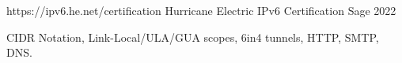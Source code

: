 \begin{cventries}
  \cventry
    {https://ipv6.he.net/certification}
    {Hurricane Electric IPv6 Certification}
    {Sage}
    {2022}
    {
      \begin{cvitems} 
        \item{CIDR Notation, Link-Local/ULA/GUA scopes, 6in4 tunnels, HTTP, SMTP, DNS.}    
      \end{cvitems}
    }
\end{cventries}

